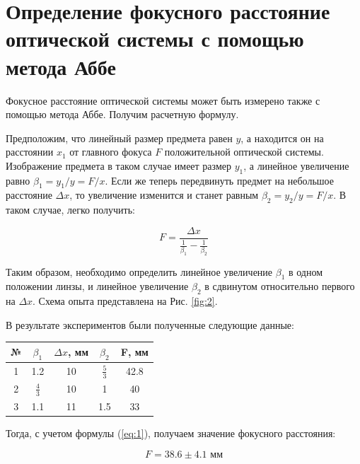 \documentclass[a4paper, 12pt]{article}
\begin{document}
\section{Определение фокусного расстояние оптической системы с помощью метода Аббе}

Фокусное расстояние оптической системы может быть измерено также с помощью метода Аббе. Получим расчетную формулу.

Предположим, что линейный размер предмета равен $y$, а находится он на расстоянии $x_1$ от главного фокуса $F$ положительной оптической системы. Изображение предмета в таком случае имеет размер $y_1$, а линейное увеличение равно $\beta_1 = y_1 / y = F / x$. Если же теперь передвинуть предмет на небольшое расстояние $\Delta x$, то увеличение изменится и станет равным $\beta_2 = y_2 / y = F / x$. В таком случае, легко получить:

\begin{equation}
	F = \frac{\Delta x}{\frac{1}{\beta_1} - \frac{1}{\beta_2}}
	\label{eq:1}
\end{equation}

Таким образом, необходимо определить линейное увеличение $\beta_1$ в одном положении линзы, и линейное увеличение $\beta_2$ в сдвинутом относительно первого на $\Delta x$. Схема опыта представлена на Рис. \ref{fig:2}.

В результате экспериментов были полученные следующие данные:

\begin{center}
	\begin{tabular}{|c|c|c|c|c|}
		\hline
		 № & $\beta_1$ & $\Delta x$, мм & $\beta_2$ & F, мм \\
		\hline
		1 & 1.2 & 10 & $\frac 5 3$ & 42.8 \\
		\hline
		2 & $\frac 4 3$ & 10 & 1 & 40\\
		\hline
		3 & 1.1 & 11 & 1.5 & 33 \\
		\hline
	\end{tabular}
\end{center}

Тогда, с учетом формулы (\ref{eq:1}), получаем значение фокусного расстояния:

\begin{equation*} 
	F = 38.6 \pm 4.1 \text{ мм}
\end{equation*}
\end{document}
